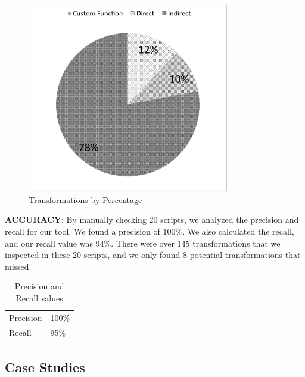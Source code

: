 \documentclass{sigplanconf}
\begin{document}
\begin{figure}[htbp!]
\begin{center}
\includegraphics[width=250pt]{images/TransformationsChart}
\nocaptionrule
\caption{Transformations by Percentage}
\label{fig:transformations_pieChart}
\end{center}
\end{figure}

\textbf{ACCURACY}: By manually checking 20 scripts, we analyzed the precision and recall for our tool.  We found a precision of 100\%.  We also calculated the recall, and our recall value was 94\%. There were over 145 transformations that we inspected in these 20 scripts, and we only found 8 potential transformations that \tool missed.

\begin{table}[htdp]
\begin{center}
\begin{tabular}{ll}

Precision & 100\% \\
Recall & 95\% \\
\end{tabular}
\nocaptionrule
\caption{Precision and Recall values}
\end{center}
\label{table:precAndRecall}
\end{table}%

\subsection{Case Studies}
\end{document}
